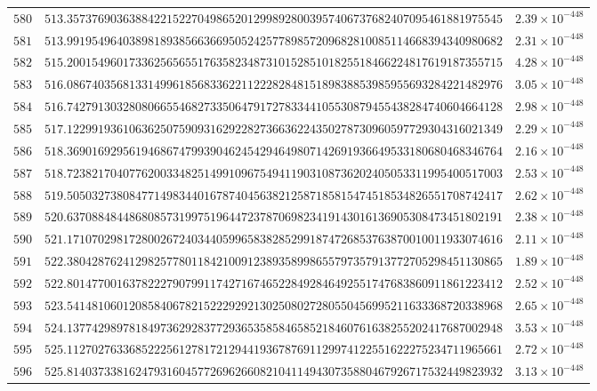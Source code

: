 \documentclass[12pt,reqno]{amsart}
\theoremstyle{remark}
\begin{document}
\begin{longtable}{clc}
$580$ & $513.3573769036388422152270498652012998928003957406737682407095461881975545$ & $2.39\times 10^{-448}$ \\
$581$ & $513.9919549640389818938566366950524257789857209682810085114668394340980682$ & $2.31\times 10^{-448}$ \\
$582$ & $515.2001549601733625656551763582348731015285101825518466224817619187355715$ & $4.28\times 10^{-448}$ \\
$583$ & $516.0867403568133149961856833622112228284815189838853985955693284221482976$ & $3.05\times 10^{-448}$ \\
$584$ & $516.7427913032808066554682733506479172783344105530879455438284740604664128$ & $2.98\times 10^{-448}$ \\
$585$ & $517.1229919361063625075909316292282736636224350278730960597729304316021349$ & $2.29\times 10^{-448}$ \\
$586$ & $518.3690169295619468674799390462454294649807142691936649533180680468346764$ & $2.16\times 10^{-448}$ \\
$587$ & $518.7238217040776200334825149910967549411903108736202405053311995400517003$ & $2.53\times 10^{-448}$ \\
$588$ & $519.5050327380847714983440167874045638212587185815474518534826551708742417$ & $2.62\times 10^{-448}$ \\
$589$ & $520.6370884844868085731997519644723787069823419143016136905308473451802191$ & $2.38\times 10^{-448}$ \\
$590$ & $521.1710702981728002672403440599658382852991874726853763870010011933074616$ & $2.11\times 10^{-448}$ \\
$591$ & $522.3804287624129825778011842100912389358998655797357913772705298451130865$ & $1.89\times 10^{-448}$ \\
$592$ & $522.8014770016378222790799117427167465228492846492551747683860911861223412$ & $2.52\times 10^{-448}$ \\
$593$ & $523.5414810601208584067821522292921302508027280550456995211633368720338968$ & $2.65\times 10^{-448}$ \\
$594$ & $524.1377429897818497362928377293653585846585218460761638255202417687002948$ & $3.53\times 10^{-448}$ \\
$595$ & $525.1127027633685222561278172129441936787691129974122551622275234711965661$ & $2.72\times 10^{-448}$ \\
$596$ & $525.8140373381624793160457726962660821041149430735880467926717532449823932$ & $3.13\times 10^{-448}$ \\

\end{longtable}
\end{document}
